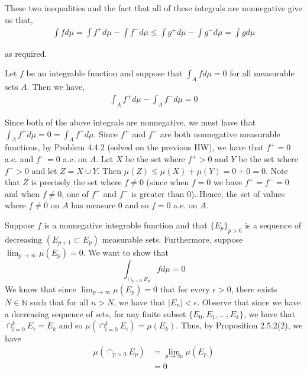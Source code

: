 \documentclass[12pt]{article}
\newenvironment{problem}[2][Problem]{\begin{trivlist}
\item[\hskip \labelsep {\bfseries #1}\hskip \labelsep {\bfseries #2.}]}{\end{trivlist}}
\begin{document}
These two inequalities and the fact that all of these integrals are nonnegative give us that,
\begin{align*}
\int f d\mu = \int f^+ d\mu - \int f^- d\mu \leq \int g^+ d\mu - \int g^- d\mu = \int g d\mu
\end{align*}

as required.

\newpage
\begin{problem}{6}
\end{problem}

Let $f$ be an integrable function and suppose that $\int_A f d\mu = 0$ for all measurable sets $A$. Then we have,
\begin{align*}
\int_A f^+ d\mu - \int_A f^- d\mu = 0
\end{align*}

Since both of the above integrals are nonnegative, we must have that $\int_A f^+ d\mu = 0 = \int_A f^- d\mu$. Since $f^+$ and $f^-$ are both nonnegative measurable functions, by Problem 4.4.2 (solved on the previous HW), we have that $f^+ = 0$ a.e. and $f^- = 0$ a.e. on $A$. Let $X$ be the set where $f^+ > 0$ and  $Y$ be the set where $f^- > 0$ and let $Z = X \cup Y$. Then $\mu(Z) \leq \mu(X) + \mu(Y) = 0 + 0 = 0$. Note that $Z$ is precisely the set where $f \neq 0$ (since when $f = 0$ we have $f^+ = f^- = 0$ and when $f \neq 0$, one of $f^+$ and $f^-$ is greater than $0$). Hence, the set of values where $f \neq 0$ on $A$ has measure $0$ and so $f = 0$ a.e. on $A$.\\

\begin{problem}{7}
\end{problem}

Suppose $f$ is a nonnegative integrable function and that $\{E_p\}_{p>0}$ is a sequence of decreasing $(E_{p+1} \subset E_p)$ measurable sets. Furthermore, suppose $\lim_{p \to \infty} \mu(E_p) = 0$. We want to show that $$\int_{\cap_{p > 0} E_p} f d\mu = 0$$ We know that since $\lim_{p \to \infty} \mu(E_p) = 0$ that for every $\epsilon > 0$, there exists $N \in \mathbb{N}$ such that for all $n > N$, we have that $|E_n| < \epsilon$. Observe that since we have a decreasing sequence of sets, for any finite subset $\{E_0, E_1, \ldots, E_k\}$, we have that $\cap_{i=0}^k E_i = E_k$ and so $\mu\left(\cap_{i=0}^k E_i\right) = \mu(E_k)$. Thus, by Proposition 2.5.2(2), we have
\begin{align*}
\mu \left(\cap_{p>0} E_p\right) &= \lim_{p \to \infty} \mu \left(E_p\right)\\
&= 0
\end{align*}
\end{document}
